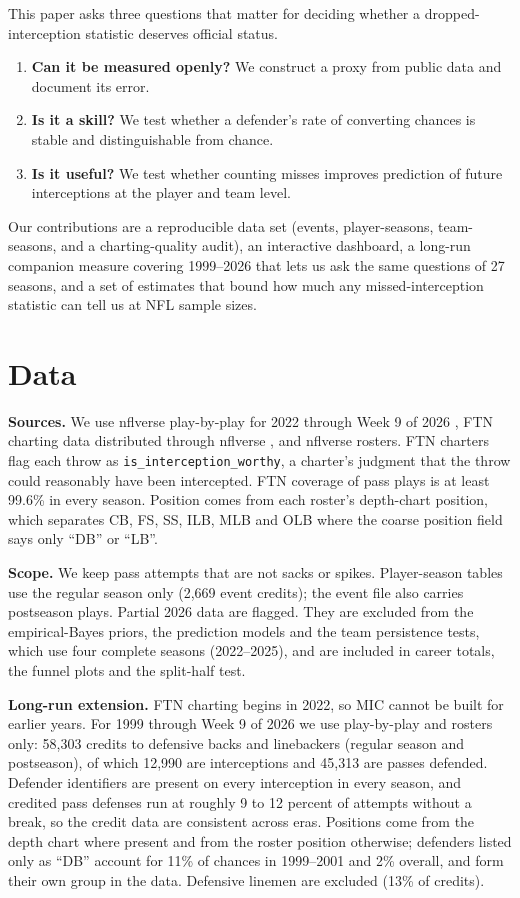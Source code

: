 \documentclass[11pt]{article}
\begin{document}
This paper asks three questions that matter for deciding whether a dropped-interception statistic deserves official status.
\begin{enumerate}[nosep]
\item \textbf{Can it be measured openly?} We construct a proxy from public data and document its error.
\item \textbf{Is it a skill?} We test whether a defender's rate of converting chances is stable and distinguishable from chance.
\item \textbf{Is it useful?} We test whether counting misses improves prediction of future interceptions at the player and team level.
\end{enumerate}
Our contributions are a reproducible data set (events, player-seasons, team-seasons, and a charting-quality audit), an interactive dashboard, a long-run companion measure covering 1999--2026 that lets us ask the same questions of 27 seasons, and a set of estimates that bound how much any missed-interception statistic can tell us at NFL sample sizes.

\section{Data}
\textbf{Sources.} We use nflverse play-by-play for 2022 through Week 9 of 2026 \cite{nflverse}, FTN charting data distributed through nflverse \cite{ftn}, and nflverse rosters. FTN charters flag each throw as \texttt{is\_interception\_worthy}, a charter's judgment that the throw could reasonably have been intercepted. FTN coverage of pass plays is at least 99.6\% in every season. Position comes from each roster's depth-chart position, which separates CB, FS, SS, ILB, MLB and OLB where the coarse position field says only ``DB'' or ``LB''.

\textbf{Scope.} We keep pass attempts that are not sacks or spikes. Player-season tables use the regular season only (2,669 event credits); the event file also carries postseason plays. Partial 2026 data are flagged. They are excluded from the empirical-Bayes priors, the prediction models and the team persistence tests, which use four complete seasons (2022--2025), and are included in career totals, the funnel plots and the split-half test.

\textbf{Long-run extension.} FTN charting begins in 2022, so MIC cannot be built for earlier years. For 1999 through Week 9 of 2026 we use play-by-play and rosters only: 58,303 credits to defensive backs and linebackers (regular season and postseason), of which 12,990 are interceptions and 45,313 are passes defended. Defender identifiers are present on every interception in every season, and credited pass defenses run at roughly 9 to 12 percent of attempts without a break, so the credit data are consistent across eras. Positions come from the depth chart where present and from the roster position otherwise; defenders listed only as ``DB'' account for 11\% of chances in 1999--2001 and 2\% overall, and form their own group in the data. Defensive linemen are excluded (13\% of credits).
\end{document}
